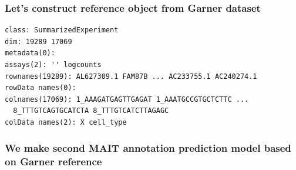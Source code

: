 \documentclass[
  letterpaper,
  DIV=11,
  numbers=noendperiod]{scrartcl}
\newenvironment{Shaded}{\begin{snugshade}}{\end{snugshade}}
\newcommand{\AttributeTok}[1]{\textcolor[rgb]{0.40,0.45,0.13}{#1}}
\newcommand{\DecValTok}[1]{\textcolor[rgb]{0.68,0.00,0.00}{#1}}
\newcommand{\FunctionTok}[1]{\textcolor[rgb]{0.28,0.35,0.67}{#1}}
\newcommand{\NormalTok}[1]{\textcolor[rgb]{0.00,0.23,0.31}{#1}}
\newcommand{\OtherTok}[1]{\textcolor[rgb]{0.00,0.23,0.31}{#1}}
\newcommand{\SpecialCharTok}[1]{\textcolor[rgb]{0.37,0.37,0.37}{#1}}
\newcommand{\StringTok}[1]{\textcolor[rgb]{0.13,0.47,0.30}{#1}}
\begin{document}
\hypertarget{lets-construct-reference-object-from-garner-dataset}{%
\subsubsection{Let's construct reference object from Garner
dataset}\label{lets-construct-reference-object-from-garner-dataset}}

\begin{Shaded}
\end{Shaded}

\begin{verbatim}
class: SummarizedExperiment 
dim: 19289 17069 
metadata(0):
assays(2): '' logcounts
rownames(19289): AL627309.1 FAM87B ... AC233755.1 AC240274.1
rowData names(0):
colnames(17069): 1_AAAGATGAGTTGAGAT 1_AAATGCCGTGCTCTTC ...
  8_TTTGTCAGTGCATCTA 8_TTTGTCATCTTAGAGC
colData names(2): X cell_type
\end{verbatim}

\hypertarget{we-make-second-mait-annotation-prediction-model-based-on-garner-reference}{%
\subsubsection{We make second MAIT annotation prediction model based on
Garner
reference}\label{we-make-second-mait-annotation-prediction-model-based-on-garner-reference}}
\end{document}
